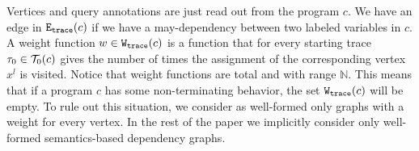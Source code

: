  Vertices and query annotations are just read out from the program $c$. We have an edge in $\mathtt{{E_{trace}}}(c)$ if we have a may-dependency between two labeled variables in $c$.
A weight function $w \in \mathtt{{W_{trace}}}(c)$ is a function that for every starting trace $\mathtt{\tau}_0 \in \mathcal{T}_0(c)$ 
gives the number of times the assignment of the corresponding vertex $x^l$ is visited. Notice that weight functions are total and with range $\mathbb{N}$. This means that if a program $c$ has some non-terminating behavior, the set $\mathtt{{W_{trace}}}(c)$ will be empty. 
To rule out this situation, we consider as well-formed only graphs with a weight for every vertex. 
In the rest of the paper we  implicitly consider only well-formed semantics-based dependency graphs. 




